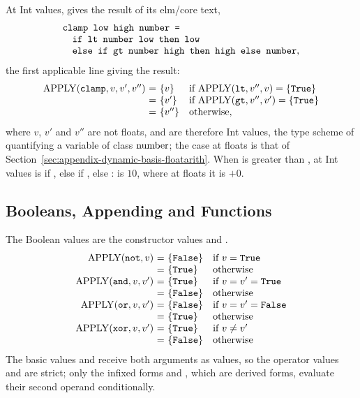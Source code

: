 At Int values,  gives the result of its elm/core text,
\[
\begin{array}{@{}l@{}}
\kw{clamp low high number =}\\
\quad\kw{if lt number low then low}\\
\quad\kw{else if gt number high then high else number},
\end{array}
\]
the first applicable line giving the result: %
\[
  \begin{array}{@{}r@{\ }c@{\ }l@{\quad}l@{}}
  \APPLY(\kw{clamp},v,v',v'') & = & \{v\} & \text{if}\ \APPLY(\kw{lt},v'',v)=\{\kw{True}\}\\
                              & = & \{v'\} & \text{if}\ \APPLY(\kw{gt},v'',v')=\{\kw{True}\}\\
                              & = & \{v''\} & \text{otherwise},
  \end{array}
\]
where $v$, $v'$ and $v''$ are not floats, and are therefore Int values, the
type scheme of  quantifying a variable of class $\mathrm{number}$; the case
at floats is that of Section~\ref{sec:appendix-dynamic-basis-floatarith}.
When  is greater than ,  at Int values is
 if , else  if , else :
 is $10$, where at floats it is $+0$. %

\subsection{Booleans, Appending and Functions}\label{sec:appendix-dynamic-basis-bool}

The Boolean values are the constructor values  and .
\[
  \begin{array}{@{}r@{\ }c@{\ }l@{\quad}l@{}}
  \APPLY(\kw{not},v) & = & \{\kw{False}\} & \text{if}\ v=\kw{True}\\
                     & = & \{\kw{True}\} & \text{otherwise}\\
  \APPLY(\kw{and},v,v') & = & \{\kw{True}\} & \text{if}\ v=v'=\kw{True}\\
                        & = & \{\kw{False}\} & \text{otherwise}\\
  \APPLY(\kw{or},v,v') & = & \{\kw{False}\} & \text{if}\ v=v'=\kw{False}\\
                       & = & \{\kw{True}\} & \text{otherwise}\\
  \APPLY(\kw{xor},v,v') & = & \{\kw{True}\} & \text{if}\ v\neq v'\\
                        & = & \{\kw{False}\} & \text{otherwise}
  \end{array}
\]
The basic values  and  receive both arguments as values, so the
operator values \kw{(\&\&)} and \kw{(||)} are strict; only the infixed forms
 and , which are derived forms, evaluate their
second operand conditionally. %

